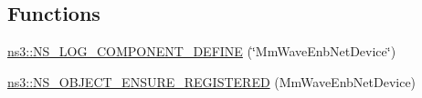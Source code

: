 \subsection*{Functions}
\begin{DoxyCompactItemize}
\item 
\hyperlink{namespacens3_a8441b94c43d59c79a5a518ba9b8c5c08}{ns3\+::\+N\+S\+\_\+\+L\+O\+G\+\_\+\+C\+O\+M\+P\+O\+N\+E\+N\+T\+\_\+\+D\+E\+F\+I\+NE} (\char`\"{}Mm\+Wave\+Enb\+Net\+Device\char`\"{})
\item 
\hyperlink{namespacens3_ac9141f5d4b9764e6f4b10c5f13ad71f5}{ns3\+::\+N\+S\+\_\+\+O\+B\+J\+E\+C\+T\+\_\+\+E\+N\+S\+U\+R\+E\+\_\+\+R\+E\+G\+I\+S\+T\+E\+R\+ED} (Mm\+Wave\+Enb\+Net\+Device)
\end{DoxyCompactItemize}
